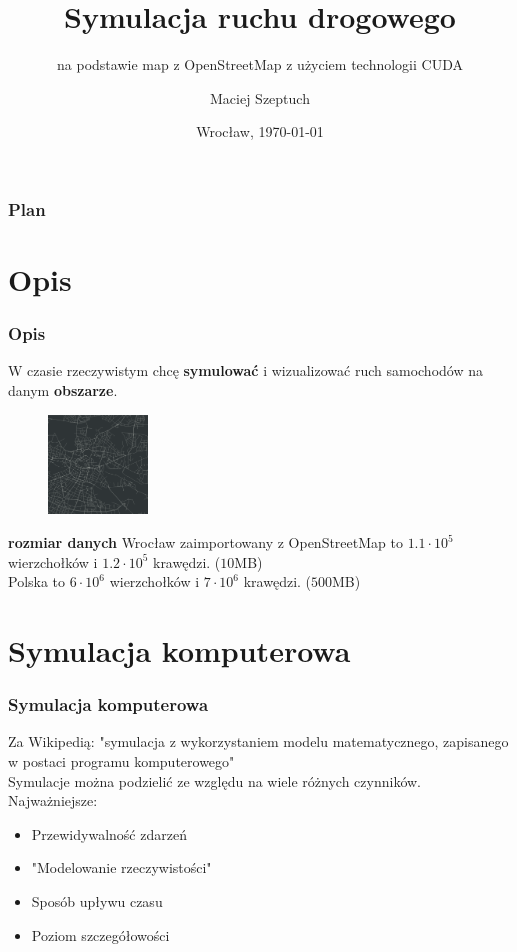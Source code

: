 \documentclass[slidestop, compress, 10pt]{beamer}
\title{Symulacja ruchu drogowego}
\subtitle{na podstawie map z OpenStreetMap z użyciem technologii CUDA}
\author{Maciej Szeptuch}
\date{Wrocław, \today}
\begin{document}
\begin{frame}
    \titlepage
\end{frame}

\begin{frame}
    \frametitle{Plan}
    \tableofcontents
\end{frame}

\section{Opis}
    \begin{frame}
        \frametitle{Opis}
        \centering
        W czasie rzeczywistym chcę \textbf{symulować} i wizualizować ruch samochodów na danym \textbf{obszarze}.

        \begin{figure}
            \includegraphics[width=100px]{trafficsim.png}
        \end{figure}

        \begin{block}{\textbf{rozmiar danych}}
            Wrocław zaimportowany z OpenStreetMap to $1.1 \cdot 10^5$ wierzchołków i $1.2 \cdot 10^5$ krawędzi. ($10$MB) \\
            Polska to $6 \cdot 10^6$ wierzchołków i $7 \cdot 10^6$ krawędzi. ($500$MB)
        \end{block}
    \end{frame}

\section{Symulacja komputerowa}
    \begin{frame}
        \frametitle{Symulacja komputerowa}
        Za Wikipedią: "symulacja z wykorzystaniem modelu matematycznego, zapisanego w postaci programu komputerowego" \\
        Symulacje można podzielić ze względu na wiele różnych czynników. \\
        Najważniejsze: \\
        \begin{itemize}
            \item<2-> Przewidywalność zdarzeń
            \item<3-> "Modelowanie rzeczywistości"
            \item<4-> Sposób upływu czasu
            \item<5-> Poziom szczegółowości
        \end{itemize}
    \end{frame}
\end{document}
